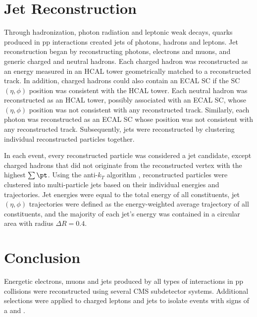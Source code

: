 \section{Jet Reconstruction}
\label{sec:jetReco}
Through hadronization, photon radiation and leptonic weak decays, quarks produced in pp interactions 
created jets of photons, hadrons and leptons.  Jet reconstruction began by reconstructing photons, 
electrons and muons, and generic charged and neutral hadrons.  Each charged hadron was reconstructed as 
an energy measured in an HCAL tower geometrically matched to a reconstructed track.  In addition, 
charged hadrons could also contain an ECAL SC if the SC $(\eta, \phi)$ position was consistent with 
the HCAL tower.  Each neutral hadron was reconstructed as an HCAL tower, possibly associated with 
an ECAL SC, whose $(\eta, \phi)$ position was not consistent with any reconstructed track.  Similarly, 
each photon was reconstructed as an ECAL SC whose position was not consistent with any reconstructed 
track.  Subsequently, jets were reconstructed by clustering individual reconstructed particles together.

In each event, every reconstructed particle was considered a jet candidate, except charged 
hadrons that did not originate from the reconstructed vertex with the highest $\sum \pt$.  Using the 
anti-$k_{T}$ algorithm \cite{antikt}, reconstructed particles were clustered into multi-particle jets 
based on their individual energies and trajectories.  Jet energies were equal to the total energy of 
all constituents, jet $(\eta, \phi)$ trajectories were defined as the energy-weighted average trajectory 
of all constituents, and the majority of each jet's energy was contained in a circular area with radius 
$\Delta R = 0.4$.


\section{Conclusion}
\label{sec:recoConclusion}
Energetic electrons, muons and jets produced by all types of interactions in pp collisions were 
reconstructed using several CMS subdetector systems.  Additional selections were applied to charged leptons 
and jets to isolate events with signs of a \WR and \nul.

